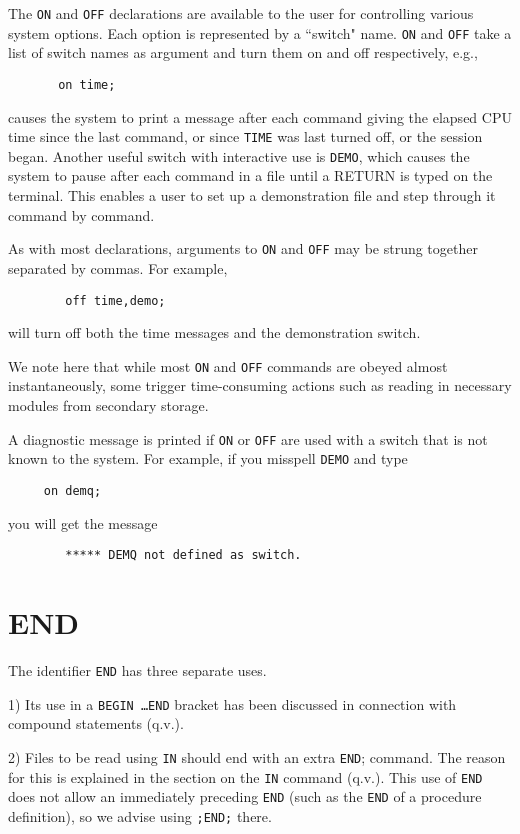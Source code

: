 The {\tt ON}  and {\tt OFF}  declarations are
available to the user for controlling various system options.  Each option
is represented by a ``switch" name. {\tt ON} and {\tt OFF}
take a list of switch names as argument and turn them on and off
respectively, e.g.,
\begin{verbatim}
       on time;
\end{verbatim}
causes the system to print a message after each command giving the elapsed
CPU time since the last command, or since {\tt TIME}  was
last turned off, or the session began.  Another useful switch with
interactive use is {\tt DEMO}, which causes the system to pause after each
command in a file until a RETURN is typed on the terminal.  This
enables a user to set up a demonstration file and step through it command
by command.

As with most declarations, arguments to {\tt ON} and {\tt OFF} may be
strung together separated by commas.  For example,
\begin{verbatim}
        off time,demo;
\end{verbatim}
will turn off both the time messages and the demonstration switch.

We note here that while most {\tt ON} and {\tt OFF} commands are obeyed
almost instantaneously, some trigger time-consuming actions such as
reading in necessary modules from secondary storage.

A diagnostic message is printed if {\tt ON}  or {\tt OFF}
 are used with a switch that is not known to the system.  For
example, if you misspell {\tt DEMO} and type
\begin{verbatim}
     on demq;
\end{verbatim}
you will get the message
\begin{verbatim}
        ***** DEMQ not defined as switch.
\end{verbatim}

\section{END}

The identifier {\tt END}  has three separate uses.

1) Its use in a {\tt BEGIN \ldots END} bracket has been discussed in
connection with compound statements (q.v.).

2) Files to be read using {\tt IN} should end with an extra {\tt END};
command.  The reason for this is explained in the section on the {\tt IN}
command (q.v.).  This use of {\tt END} does not allow an immediately
preceding {\tt END} (such as the {\tt END} of a procedure definition), so
we advise using {\tt ;END;} there.

